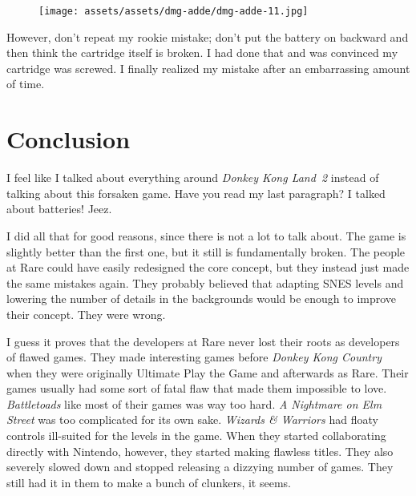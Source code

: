 \documentclass{book}
\begin{document}
\begin{figure}[hbt]
\vskip 10pt
\centering \texttt{[image: assets/assets/dmg-adde/dmg-adde-11.jpg]}
\vskip 6pt
\end{figure}
However, don’t repeat my rookie mistake; don’t put the battery on backward and then think the cartridge itself is broken. I had done that and was convinced my cartridge was screwed. I finally realized my mistake after an embarrassing amount of time.

\FloatBarrier\needspace{10mm}\section*{Conclusion}\nopagebreak[4]

I feel like I talked about everything around \emph{Donkey Kong Land 2} instead of talking about this forsaken game. Have you read my last paragraph? I talked about batteries! Jeez.

I did all that for good reasons, since there is not a lot to talk about. The game is slightly better than the first one, but it still is fundamentally broken. The people at Rare could have easily redesigned the core concept, but they instead just made the same mistakes again. They probably believed that adapting SNES levels and lowering the number of details in the backgrounds would be enough to improve their concept. They were wrong.

I guess it proves that the developers at Rare never lost their roots as developers of flawed games. They made interesting games before \emph{Donkey Kong Country} when they were originally Ultimate Play the Game and afterwards as Rare. Their games usually had some sort of fatal flaw that made them impossible to love. \emph{Battletoads} like most of their games was way too hard. \emph{A Nightmare on Elm Street} was too complicated for its own sake. \emph{Wizards \& Warriors} had floaty controls ill-suited for the levels in the game. When they started collaborating directly with Nintendo, however, they started making flawless titles. They also severely slowed down and stopped releasing a dizzying number of games. They still had it in them to make a bunch of clunkers, it seems.
\end{document}
